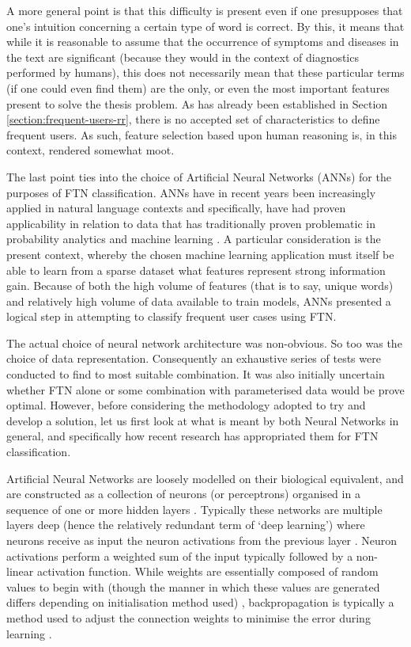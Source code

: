 A more general point is that this difficulty is present even if one presupposes that one's intuition concerning a certain type of word is correct. By this, it means that while it is reasonable to assume that the occurrence of symptoms and diseases in the text are significant (because they would in the context of diagnostics performed by humans), this does not necessarily mean that these particular terms (if one could even find them) are the only, or even the most important features present to solve the thesis problem. As has already been established in Section \ref{section:frequent-users-rr}, there is no accepted set of characteristics to define frequent users. As such, feature selection based upon human reasoning is, in this context, rendered somewhat moot. 

The last point ties into the choice of Artificial Neural Networks (ANNs) for the purposes of FTN classification. ANNs have in recent years been increasingly applied in natural language contexts and specifically, have had proven applicability in relation to data that has traditionally proven problematic in probability analytics and machine learning \cite{goldberg2017neural}. A particular consideration is the present context, whereby the chosen machine learning application must itself be able to learn from a sparse dataset what features represent strong information gain. Because of both the high volume of features (that is to say, unique words) and relatively high volume of data available to train models, ANNs presented a logical step in attempting to classify frequent user cases using FTN. 


The actual choice of neural network architecture was non-obvious. So too was the choice of data representation. Consequently an exhaustive series of tests were conducted to find to most suitable combination. It was also initially uncertain whether FTN alone or some combination with parameterised data would be prove optimal. However, before considering the methodology adopted to try and develop a solution, let us first look at what is meant by both Neural Networks in general, and specifically how recent research has appropriated them for FTN classification.  

Artificial Neural Networks are loosely modelled on their biological equivalent, and are constructed as a collection of neurons (or perceptrons) \cite{rosenblatt1957perceptron} organised in a sequence of one or more hidden layers \cite{goldberg2017neural}. Typically these networks are multiple layers deep (hence the relatively redundant term of `deep learning') where neurons receive as input the neuron activations from the previous layer \cite{rumelhart1988learning}. Neuron activations perform a weighted sum of the input typically followed by a non-linear activation function. While weights are essentially composed of random values to begin with (though the manner in which these values are generated differs depending on initialisation method used) \cite{steinwart2019sober}, backpropagation is typically a method used to adjust the connection weights to minimise the error during learning \cite{rumelhart1988learning}. 

